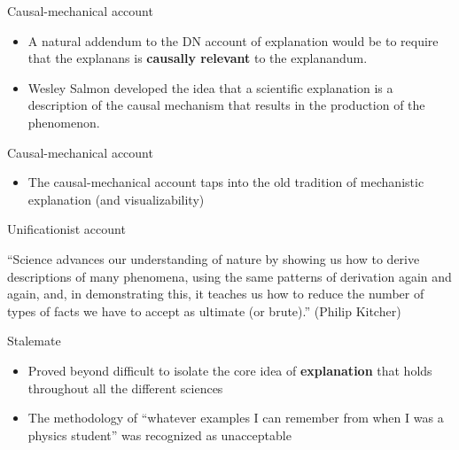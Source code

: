 \documentclass[fleqn]{beamer}
\begin{document}
\begin{frame}{Causal-mechanical account}

  \begin{itemize}
  \item A natural addendum to the DN account of explanation would be
    to require that the explanans is \textbf{causally relevant} to the
    explanandum.
  \item Wesley Salmon developed the idea that a scientific explanation
    is a description of the causal mechanism that results in the
    production of the phenomenon.  \end{itemize}

\end{frame}

\begin{frame}{Causal-mechanical account}

  \begin{itemize}
  \item The causal-mechanical account taps into the old tradition of
    mechanistic explanation (and visualizability)
  \end{itemize}



\end{frame}

\begin{frame}{Unificationist account}

  ``Science advances our understanding of nature by showing us how to
  derive descriptions of many phenomena, using the same patterns of
  derivation again and again, and, in demonstrating this, it teaches
  us how to reduce the number of types of facts we have to accept as
  ultimate (or brute).'' (Philip Kitcher)

\end{frame}

\begin{frame}{Stalemate}

  \begin{itemize}
  \item Proved beyond difficult to isolate the core idea of
    \textbf{explanation} that holds throughout all the different
    sciences
  \item The methodology of ``whatever examples I can remember from
    when I was a physics student'' was recognized as unacceptable
  \end{itemize}

\end{frame}
\end{document}
